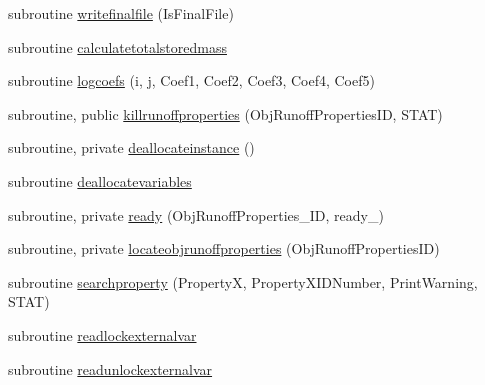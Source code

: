 \begin{DoxyCompactItemize}
\item 
subroutine \mbox{\hyperlink{namespacemodulerunoffproperties_a5e8bd361c7dae7925a217f4a40d2c75a}{writefinalfile}} (Is\+Final\+File)
\item 
subroutine \mbox{\hyperlink{namespacemodulerunoffproperties_a6cac2121fb78c6414c74fdfb38dafcb1}{calculatetotalstoredmass}}
\item 
subroutine \mbox{\hyperlink{namespacemodulerunoffproperties_a951d85579cdd397fac47bf26d3aac4cb}{logcoefs}} (i, j, Coef1, Coef2, Coef3, Coef4, Coef5)
\item 
subroutine, public \mbox{\hyperlink{namespacemodulerunoffproperties_ae0e5362eaddb64340c7e7f7c80f73e3e}{killrunoffproperties}} (Obj\+Runoff\+Properties\+ID, S\+T\+AT)
\item 
subroutine, private \mbox{\hyperlink{namespacemodulerunoffproperties_a8f7e7b0e3044653a0ff4aaf8ecc56c65}{deallocateinstance}} ()
\item 
subroutine \mbox{\hyperlink{namespacemodulerunoffproperties_a5f6b0b75ea06dc86390d8f5059e913a5}{deallocatevariables}}
\item 
subroutine, private \mbox{\hyperlink{namespacemodulerunoffproperties_a8d87a5f2a053e30ef829a92665e19d06}{ready}} (Obj\+Runoff\+Properties\+\_\+\+ID, ready\+\_\+)
\item 
subroutine, private \mbox{\hyperlink{namespacemodulerunoffproperties_adf7480277becbdd9d386b2941df91200}{locateobjrunoffproperties}} (Obj\+Runoff\+Properties\+ID)
\item 
subroutine \mbox{\hyperlink{namespacemodulerunoffproperties_ab2a49fca4ff961c8b2dfd016b005ed06}{searchproperty}} (PropertyX, Property\+X\+I\+D\+Number, Print\+Warning, S\+T\+AT)
\item 
subroutine \mbox{\hyperlink{namespacemodulerunoffproperties_a281dc2c8e1ac168295c6bbff10a4bf54}{readlockexternalvar}}
\item 
subroutine \mbox{\hyperlink{namespacemodulerunoffproperties_abc9cf8901e71a0c3d3b26dd7b5414361}{readunlockexternalvar}}
\end{DoxyCompactItemize}
